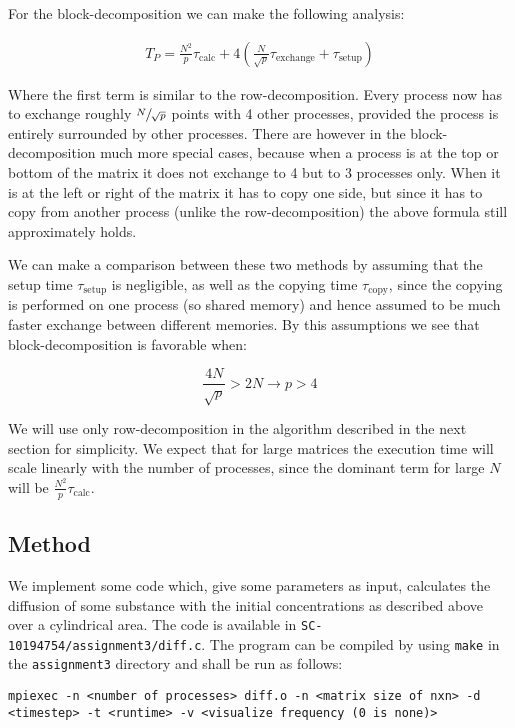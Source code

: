 \documentclass[11pt,a4paper,onecolumn]{article}
\begin{document}
For the block-decomposition we can make the following analysis:

\begin{align}
  T_P = \frac{N^2}{p}\tau_{\text{calc}} + 4(\frac{N}{\sqrt{p}}\tau_{\text{exchange}} + \tau_{\text{setup}})
\end{align}

Where the first term is similar to the row-decomposition. Every process now has to exchange roughly $\sfrac{N}{\sqrt{p}}$ points with 4 other processes, provided the process is entirely surrounded by other processes. There are however in the block-decomposition much more special cases, because when a process is at the top or bottom of the matrix it does not exchange to 4 but to 3 processes only. When it is at the left or right of the matrix it has to copy one side, but since it has to copy from another process (unlike the row-decomposition) the above formula still approximately holds.

We can make a comparison between these two methods by assuming that the setup time $\tau_{\text{setup}}$ is negligible, as well as the copying time $\tau_{\text{copy}}$, since the copying is performed on one process (so shared memory) and hence assumed to be much faster exchange between different memories. By this assumptions we see that block-decomposition is favorable when:

\begin{equation}
  \frac{4N}{\sqrt{p}} > 2N \rightarrow p > 4
\end{equation}

We will use only row-decomposition in the algorithm described in the next section for simplicity. We expect that for large matrices the execution time will scale linearly with the number of processes, since the dominant term for large $N$ will be $\frac{N^2}{p}\tau_{\text{calc}}$.

\subsection{Method}

We implement some code which, give some parameters as input, calculates the diffusion of some substance with the initial concentrations as described above over a cylindrical area. The code is available in \texttt{SC-10194754/assignment3/diff.c}. The program can be compiled by using \texttt{make} in the \texttt{assignment3} directory and shall be run as follows:

\begin{center}
  \texttt{mpiexec -n <number of processes> diff.o -n <matrix size of nxn> -d <timestep> -t <runtime> -v <visualize frequency (0 is none)>}
\end{center}
\end{document}
